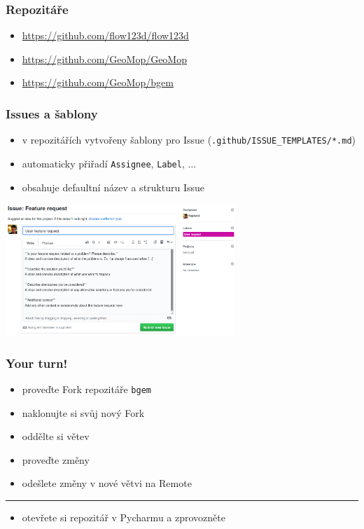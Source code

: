 \documentclass[10pt, xcolor=dvipsnames]{beamer} %
\begin{document}
\begin{frame}
  \frametitle{Repozitáře}

  \begin{itemize}
    \setlength\itemsep{15pt}
    \item \url{https://github.com/flow123d/flow123d}
    \item \url{https://github.com/GeoMop/GeoMop}
    \item \url{https://github.com/GeoMop/bgem}
  \end{itemize}

\end{frame}

\begin{frame}[fragile]
  \frametitle{Issues a šablony}

  \begin{itemize}
    \setlength\itemsep{15pt}
    \item v repozitářích vytvořeny šablony pro Issue (\verb'.github/ISSUE_TEMPLATES/*.md')
    \item automaticky přiřadí \verb'Assignee', \verb'Label', $\ldots$
    \item obsahuje defaultní název a strukturu Issue
  \end{itemize}

  \begin{center}
  \includegraphics[width=0.65\textwidth]{issue_template.png}
  \end{center}
\end{frame}

\begin{frame}[fragile]
  \frametitle{Your turn!}

  \begin{itemize}\setlength\itemsep{10pt}
    \item proveďte Fork repozitáře \verb'bgem'
    \item naklonujte si svůj nový Fork
    \item oddělte si větev
    \item proveďte změny
    \item odešlete změny v nové větvi na Remote
  \end{itemize}
  
  {\color{green}\rule{\textwidth}{1pt}}
  \begin{itemize}\setlength\itemsep{10pt}
    \item otevřete si repozitář v Pycharmu a zprovozněte
  \end{itemize}
\end{frame}
\end{document}
